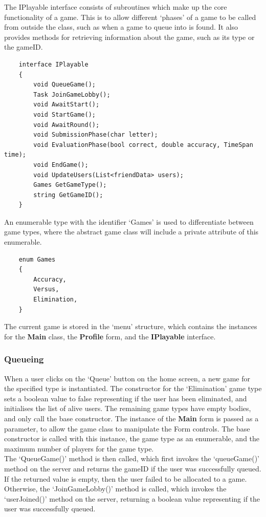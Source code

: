 \documentclass{article}
\begin{document}
The IPlayable interface consists of subroutines which make up the core functionality of a game. This is to allow different `phases' of a game to be called from outside the class, such as when a game to queue into is found. It also provides methods for retrieving information about the game, such as its type or the gameID.\@ \\

\begin{verbatim}
    interface IPlayable
    {
        void QueueGame();
        Task JoinGameLobby();
        void AwaitStart();
        void StartGame();
        void AwaitRound();
        void SubmissionPhase(char letter);
        void EvaluationPhase(bool correct, double accuracy, TimeSpan time);
        void EndGame();
        void UpdateUsers(List<friendData> users);
        Games GetGameType();
        string GetGameID();
    }
\end{verbatim}

An enumerable type with the identifier `Games' is used to differentiate between game types, where the abstract game class will include a private attribute of this enumerable.

\begin{verbatim}
    enum Games
    {
        Accuracy,
        Versus,
        Elimination,
    }
\end{verbatim}

The current game is stored in the `menu' structure, which contains the instances for the \textbf{Main} class, the \textbf{Profile} form, and the \textbf{IPlayable} interface.

\subsubsection{Queueing}

When a user clicks on the `Queue' button on the home screen, a new game for the specified type is instantiated. The constructor for the `Elimination' game type sets a boolean value to false representing if the user has been eliminated, and initialises the list of alive users. The remaining game types have empty bodies, and only call the base constructor. The instance of the \textbf{Main} form is passed as a parameter, to allow the game class to manipulate the Form controls. The base constructor is called with this instance, the game type as an enumerable, and the maximum number of players for the game type. \\

The `QueueGame()' method is then called, which first invokes the `queueGame()' method on the server and returns the gameID if the user was successfully queued. If the returned value is empty, then the user failed to be allocated to a game. Otherwise, the `JoinGameLobby()' method is called, which invokes the `userJoined()' method on the server, returning a boolean value representing if the user was successfully queued. \\
\end{document}
